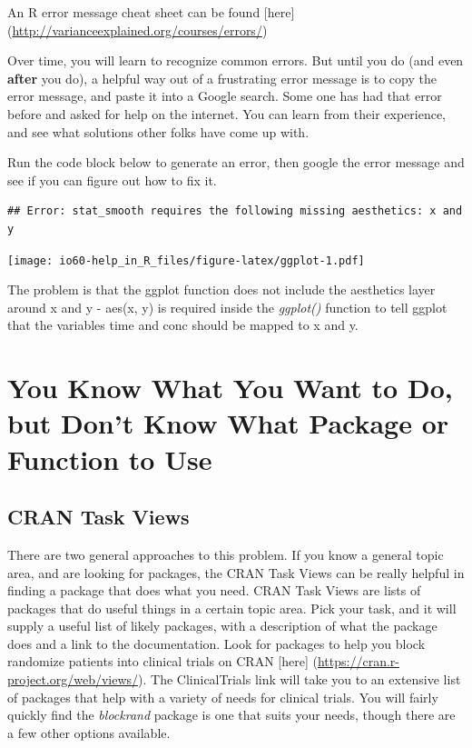 \documentclass[
]{book}
\begin{document}
An R error message cheat sheet can be found {[}here{]} (\url{http://varianceexplained.org/courses/errors/})

Over time, you will learn to recognize common errors. But until you do (and even \textbf{after} you do), a helpful way out of a frustrating error message is to copy the error message, and paste it into a Google search. Some one has had that error before and asked for help on the internet. You can learn from their experience, and see what solutions other folks have come up with.

Run the code block below to generate an error, then google the error message and see if you can figure out how to fix it.

\begin{verbatim}
## Error: stat_smooth requires the following missing aesthetics: x and y
\end{verbatim}

\texttt{[image: io60-help\_in\_R\_files/figure-latex/ggplot-1.pdf]}

The problem is that the ggplot function does not include the aesthetics layer around x and y -
aes(x, y) is required inside the \emph{ggplot()} function to tell ggplot that the variables time and conc should be mapped to x and y.

\hypertarget{you-know-what-you-want-to-do-but-dont-know-what-package-or-function-to-use}{%
\section{You Know What You Want to Do, but Don't Know What Package or Function to Use}\label{you-know-what-you-want-to-do-but-dont-know-what-package-or-function-to-use}}

\hypertarget{cran-task-views}{%
\subsection{CRAN Task Views}\label{cran-task-views}}

There are two general approaches to this problem. If you know a general topic area, and are looking for packages, the CRAN Task Views can be really helpful in finding a package that does what you need. CRAN Task Views are lists of packages that do useful things in a certain topic area. Pick your task, and it will supply a useful list of likely packages, with a description of what the package does and a link to the documentation.
Look for packages to help you block randomize patients into clinical trials on CRAN {[}here{]} (\url{https://cran.r-project.org/web/views/}). The ClinicalTrials link will take you to an extensive list of packages that help with a variety of needs for clinical trials.
You will fairly quickly find the \emph{blockrand} package is one that suits your needs, though there are a few other options available.
\end{document}
